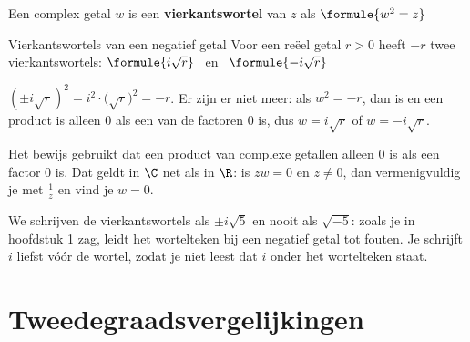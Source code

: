 \begin{theorie}
Een complex getal $w$ is een \textbf{\textcolor{accent}{vierkantswortel}} van $z$ als \quad $\formule{w^2 = z}$

\begin{stelling}{Vierkantswortels van een negatief getal}
Voor een reëel getal $r > 0$ heeft $-r$ twee vierkantswortels: \quad $\formule{i\sqrt{r}}$ \ en \ $\formule{-i\sqrt{r}}$
\end{stelling}

\begin{bewijs}
$(\pm i\sqrt{r})^2 = i^2 \cdot \bigl(\sqrt{r}\bigr)^2 = -r$. Er zijn er niet meer: als $w^2 = -r$, dan is
en een product is alleen 0 als een van de factoren 0 is, dus $w = i\sqrt{r}$ of $w = -i\sqrt{r}$.
\end{bewijs}
\end{theorie}

Het bewijs gebruikt dat een product van complexe getallen alleen 0 is als een factor 0 is. Dat geldt in $\C$ net als in $\R$: is $zw = 0$ en $z \neq 0$, dan vermenigvuldig je met $\frac{1}{z}$ en vind je $w = 0$.

We schrijven de vierkantswortels als $\pm i\sqrt{5}$ en nooit als $\sqrt{-5}$: zoals je in hoofdstuk 1 zag, leidt het wortelteken bij een negatief getal tot fouten. Je schrijft $i$ liefst vóór de wortel, zodat je niet leest dat $i$ onder het wortelteken staat.


\begin{oefeningen}
\end{oefeningen}

\section{Tweedegraadsvergelijkingen}

